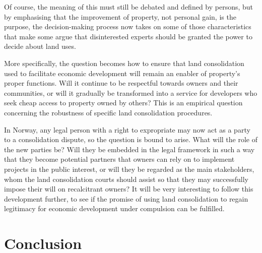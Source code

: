 Of course, the meaning of this must still be debated and defined by persons, but by emphasising that the improvement of property, not personal gain, is the purpose, the decision-making process now takes on some of those characteristics that make some argue that disinterested experts should be granted the power to decide about land uses.

More specifically, the question becomes how to ensure that land consolidation used to facilitate economic development will remain an enabler of property's proper functions. Will it continue to be respectful towards owners and their communities, or will it gradually be transformed into a service for developers who seek cheap access to property owned by others? This is an empirical question concerning the robustness of specific land consolidation procedures. 

In Norway, any legal person with a right to expropriate may now act as a party to a consolidation dispute, so the question is bound to arise. What will the role of the new parties be? Will they be embedded in the legal framework in such a way that they become potential partners that owners can rely on to implement projects in the public interest, or will they be regarded as the main stakeholders, whom the land consolidation courts should assist so that they may successfully impose their will on recalcitrant owners? It will be very interesting to follow this development further, to see if the promise of using land consolidation to regain legitimacy for economic development under compulsion can be fulfilled.

\section{Conclusion}\label{sec:conc}


